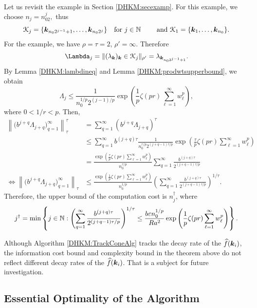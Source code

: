 \documentclass[USenglish]{article}
\theoremstyle{dgthm}
\theoremstyle{dgthm}
\theoremstyle{dgthm}
\theoremstyle{dgthm}
\theoremstyle{dgdef}
\theoremstyle{definition}
\newcommand{\hf}{\widehat{f}}
\newcommand{\norm}[2][{}]{\ensuremath{\left \lVert #2 \right \rVert}_{#1}}
\begin{document}
{Let us revisit the example in Section \ref{DHKM:secexamp}. For this example,
we choose $n_j = n_02^j,$ thus
\[{\mathcal{K}}_j = \{{\boldsymbol{k}}_{n_0 2^{j-1}+1}, \ldots, {\boldsymbol{k}}_{n_02^j}\} \quad \text{for } j \in {\mathbb{N}} \qquad \text{ and } {\mathcal{K}}_1 = \{{\boldsymbol{k}}_{1}, \ldots, {\boldsymbol{k}}_{n_0}\}.\]
For the example, we have $\rho = \tau = 2$, $\rho' = \infty$. Therefore
\[\Lambda_j = \|(\lambda_\bsk)_\bsk \in \calK_j\|_{\rho'} = \lambda_{\bsk_{n_0 2^{j-1}+1}}.\]
By Lemma \ref{DHKM:lambdineq} and Lemma \ref{DHKM:prodwtsupperbound}, we obtain
\[\Lambda_j \le \frac{1}{ n_0^{1/p} 2^{(j-1)/p}} \exp\left(\frac{1}{p}
\zeta(pr)\sum_{\ell=1}^\infty 
w_\ell^p
\right),\]
where $0< 1/r< p$. Then,
\begin{align*}
\norm[\tau]{ \bigl(b^{j+q}\Lambda_{j+q} \bigr)_{q=1}^\infty}^\tau
 & =  \sum_{q=1}^\infty
( b^{j+q}\Lambda_{j+q})^\tau \\
& \le \sum_{q=1}^\infty b^{(j+q)\tau} 
 \frac{1}{ n_0^{\tau/p} 2^{(j+q-1)\tau/p}} \exp\left(\frac{\tau}{p}
\zeta(pr)\sum_{\ell=1}^\infty 
w_\ell^p
\right)\\
& = 
\frac{\exp\left(\frac{\tau}{p}
\zeta(pr)\sum_{\ell=1}^\infty 
w_\ell^p
\right)}{ n_0^{\tau/p} } \sum_{q=1}^\infty 
\frac{b^{(j+q)\tau}}{2^{(j+q-1)\tau/p}}\\
\Leftrightarrow 
\norm[\tau]{ \bigl(b^{j+q}\Lambda_{j+q} \bigr)_{q=1}^\infty}
 & \le  \frac{\exp\left(\frac{1}{p}
\zeta(pr)\sum_{\ell=1}^\infty 
w_\ell^p
\right)}{ n_0^{1/p} } 
\left(\sum_{q=1}^\infty 
\frac{b^{(j+q)\tau}}{2^{(j+q-1)\tau/p}}
\right)^{1/\tau}.
\end{align*}
Therefore, the upper bound of the computation cost is $n_j^\dagger$, where
\[j^\dagger = \min \left \{j \in {\mathbb{N}} : 
\left(\sum_{q=1}^\infty 
\frac{b^{(j+q)\tau}}{2^{(j+q-1)\tau/p}}
\right)^{1/\tau}
\leq  \frac{b\varepsilon n_0^{1/p}}{Ra^2}\exp\left(\frac{1}{p}
\zeta(pr)\sum_{\ell=1}^\infty 
w_\ell^p
\right) \right\}.
\]
}

Although Algorithm \ref{DHKM:TrackConeAlg} tracks the decay rate of the $\hf(\bsk_i)$, the information cost bound and complexity bound in the theorem above do not reflect different decay rates of the $\hf(\bsk_i)$. That is a subject for future investigation.  


\subsection{Essential Optimality of the Algorithm}
\end{document}
